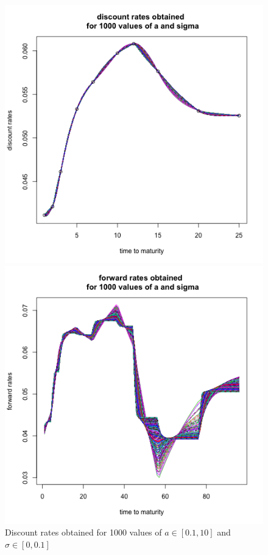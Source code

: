 \begin{figure}[!htb]
    \centering
    \begin{minipage}{.5\textwidth}
        \centering
        \includegraphics[width=1.065\linewidth, height=0.35\textheight]{gfx/chapter-yc-insurance/construction_graph21}
        \caption{Discount rates obtained for 1000 values of $a \in [0.1, 10]$ and $\sigma \in [0, 0.1]$}
        \label{fig:sensi_a_sigma_1}
    \end{minipage}%
    \begin{minipage}{0.5\textwidth}
        \centering
        \includegraphics[width=1.065\linewidth, height=0.35\textheight]{gfx/chapter-yc-insurance/construction_graph22}

\end{minipage}
\end{figure}
